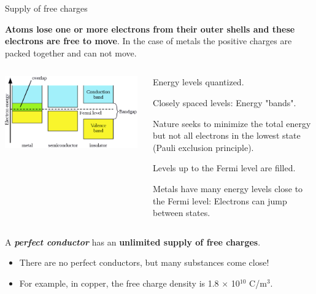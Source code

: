 %
%
%

\begin{frame}{Supply of free charges}

{\bf Atoms lose one or more electrons from their outer shells and these electrons are free to move}.
In the case of metals the positive charges are packed together and can not move.\\

\begin{columns}
  \begin{column}{0.50\textwidth}
      \begin{center}
        \includegraphics[width=0.98\textwidth]{./images/schematics/conduction_band.png}\\
      \end{center}
  \end{column}
  \begin{column}{0.50\textwidth}
    \begin{itemize}
    {\scriptsize
      \item Energy levels quantized.
      \item Closely spaced levels: Energy "bands".
      \item Nature seeks to minimize the total energy but not all electrons in the lowest state (Pauli exclusion principle).
      \item Levels up to the Fermi level are filled.
      \item Metals have many energy levels close to the Fermi level: Electrons can jump between states.\\
    }
    \end{itemize}
  \end{column}
\end{columns}

\vspace{0.3cm}

A {\em \bf perfect conductor} has an {\bf unlimited supply of free charges}.
\begin{itemize}
  \item There are no perfect conductors, but many substances come close!
  \item For example, in copper, the free charge density is 1.8 $\times$ 10$^{10}$ C/m$^3$.
\end{itemize}

\end{frame}


